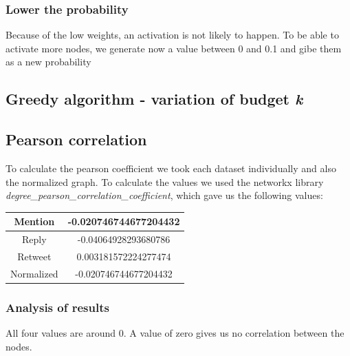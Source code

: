 \subsubsection{Lower the probability}
Because of the low weights, an activation is not likely to happen. To be able to activate more nodes, we generate now a value between 0 and 0.1 and gibe them as a new probability

\subsection{Greedy algorithm - variation of budget \textit{k}}
\subsection{Pearson correlation}
To calculate the pearson coefficient we took each dataset individually and also the normalized graph.
To calculate the values we used the networkx library \textit{degree\_pearson\_correlation\_coefficient}, which gave us the following values:
\begin{center}
 \begin{tabular}{||c | c ||} 
 \hline
 Mention & -0.020746744677204432 \\
 \hline
 Reply & -0.04064928293680786\\ 
 \hline
 Retweet & 0.003181572224277474\\ 
 \hline
 Normalized & -0.020746744677204432 \\ 
 \hline
\end{tabular}
\end{center}
\subsubsection{Analysis of results}
All four values are around 0. A value of zero gives us no correlation between the nodes.  %
